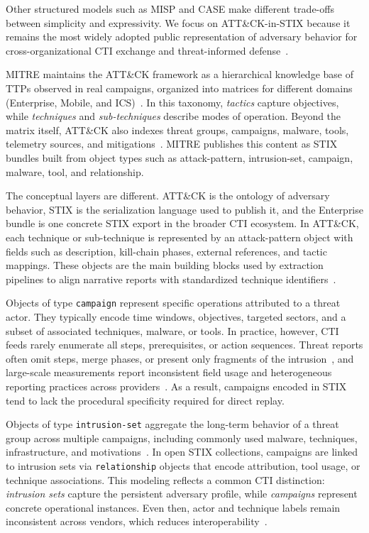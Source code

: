 \documentclass[sigconf]{acmart}
\newcommand{\stix}{STIX\xspace}
\newcommand{\mitre}{MITRE\xspace}
\newcommand{\attack}{ATT\&CK\xspace}
\begin{document}
Other structured models such as MISP and CASE make different trade-offs between simplicity and expressivity. We focus on \attack{}-in-\stix{} because it remains the most widely adopted public representation of adversary behavior for cross-organizational CTI exchange and threat-informed defense~\cite{jin2024sharing,stixspec}.

\mitre{} maintains the \attack{} framework as a hierarchical knowledge base of TTPs observed in real campaigns, organized into matrices for different domains (Enterprise, Mobile, and ICS)~\cite{strom2018mitre}. In this taxonomy, \emph{tactics} capture objectives, while \emph{techniques} and \emph{sub-techniques} describe modes of operation. Beyond the matrix itself, \attack{} also indexes threat groups, campaigns, malware, tools, telemetry sources, and mitigations~\cite{strom2018mitre}. \mitre{} publishes this content as \stix{} bundles built from object types such as attack-pattern, intrusion-set, campaign, malware, tool, and relationship.

The conceptual layers are different. \attack{} is the ontology of adversary behavior, \stix{} is the serialization language used to publish it, and the Enterprise bundle is one concrete \stix{} export in the broader CTI ecosystem. In \attack{}, each technique or sub-technique is represented by an attack-pattern object with fields such as description, kill-chain phases, external references, and tactic mappings. These objects are the main building blocks used by extraction pipelines to align narrative reports with standardized technique identifiers~\cite{10117505,savat2021extractor,marvin2025sokttp}.

Objects of type \texttt{campaign} represent specific operations attributed to a threat actor. They typically encode time windows, objectives, targeted sectors, and a subset of associated techniques, malware, or tools. In practice, however, CTI feeds rarely enumerate all steps, prerequisites, or action sequences. Threat reports often omit steps, merge phases, or present only fragments of the intrusion~\cite{savat2021extractor}, and large-scale measurements report inconsistent field usage and heterogeneous reporting practices across providers~\cite{jin2024sharing}. As a result, campaigns encoded in \stix{} tend to lack the procedural specificity required for direct replay.

Objects of type \texttt{intrusion-set} aggregate the long-term behavior of a threat group across multiple campaigns, including commonly used malware, techniques, infrastructure, and motivations~\cite{abdulellah2021atlas}. In open \stix{} collections, campaigns are linked to intrusion sets via \texttt{relationship} objects that encode attribution, tool usage, or technique associations. This modeling reflects a common CTI distinction: \emph{intrusion sets} capture the persistent adversary profile, while \emph{campaigns} represent concrete operational instances. Even then, actor and technique labels remain inconsistent across vendors, which reduces interoperability~\cite{vermeer2022evolution}.
\end{document}
